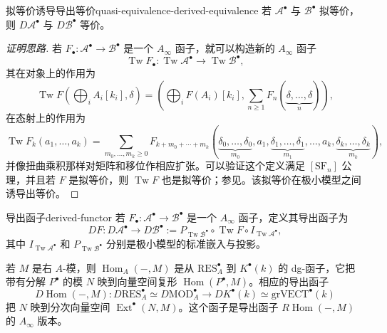 \begin{lemma}{拟等价诱导导出等价}{quasi-equivalence-derived-equivalence}
若 $\mathcal A^\bullet$ 与 $\mathcal B^\bullet$ 拟等价，则 $D\mathcal A^\bullet$ 与 $D\mathcal B^\bullet$ 等价。
\end{lemma}
\begin{proof}[证明思路]
若 $F_\bullet\colon\mathcal A^\bullet\to\mathcal B^\bullet$ 是一个 $A_\infty$ 函子，就可以构造新的 $A_\infty$ 函子
\[
  \operatorname{Tw}F_\bullet\colon
  \operatorname{Tw}\mathcal A^\bullet\to\operatorname{Tw}\mathcal B^\bullet,
\]
其在对象上的作用为
\[
  \operatorname{Tw}F
  \left(\bigoplus_iA_i[k_i],\delta\right)
  =
  \left(\bigoplus_iF(A_i)[k_i],
  \sum_{n\geq1}F_n(\underbrace{\delta,\ldots,\delta}_{n})\right),
\]
在态射上的作用为
\[
  \operatorname{Tw}F_k(a_1,\ldots,a_k)
  =
  \sum_{m_0,\ldots,m_k\geq0}
  F_{k+m_0+\cdots+m_k}
  (\underbrace{\delta_0,\ldots,\delta_0}_{m_0},
   a_1,\underbrace{\delta_1,\ldots,\delta_1}_{m_1},\ldots,a_k,
   \underbrace{\delta_k,\ldots,\delta_k}_{m_k}),
\]
并像扭曲乘积那样对矩阵和移位作相应扩张。可以验证这个定义满足 $[\mathrm{SF}_n]$ 公理，并且若 $F$ 是拟等价，则 $\operatorname{Tw}F$ 也是拟等价；参见。该拟等价在极小模型之间诱导出等价。
\end{proof}

\begin{definition}{导出函子}{derived-functor}
若 $F_\bullet\colon\mathcal A^\bullet\to\mathcal B^\bullet$ 是一个 $A_\infty$ 函子，定义其导出函子为
\[
  DF\colon D\mathcal A^\bullet\to D\mathcal B^\bullet
  :=P_{\operatorname{Tw}\mathcal B^\bullet}\circ
    \operatorname{Tw}F\circ I_{\operatorname{Tw}\mathcal A^\bullet},
\]
其中 $I_{\operatorname{Tw}\mathcal A^\bullet}$ 和
$P_{\operatorname{Tw}\mathcal B^\bullet}$ 分别是极小模型的标准嵌入与投影。
\end{definition}

\begin{example}[导出 Hom 函子]\label{ex:derived-hom-functor}
若 $M$ 是右 $A$-模，则 $\operatorname{Hom}_A(-,M)$ 是从 $\mathrm{RES}_A^\bullet$ 到 $K^\bullet(k)$ 的 dg-函子，它把带有分解 $P^\bullet$ 的模 $N$ 映到向量空间复形 $\operatorname{Hom}(P^\bullet,M)$。相应的导出函子
\[
  D\operatorname{Hom}(-,M)\colon
  D\mathrm{RES}_A^\bullet\simeq D\mathrm{MOD}_A^\bullet
  \longrightarrow DK^\bullet(k)\simeq\mathrm{grVECT}^\bullet(k)
\]
把 $N$ 映到分次向量空间 $\operatorname{Ext}^\bullet(N,M)$。这个函子是导出函子 $R\operatorname{Hom}(-,M)$ 的 $A_\infty$ 版本。
\end{example}

